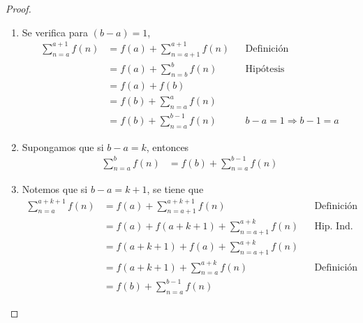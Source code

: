     \begin{proof}\leavevmode
      \begin{enumerate}[label=\Roman*)]
          \item Se verifica para $(b-a)=1$,
          \begin{align*}
            \sum_{n=a}^{a+1} f(n) &= f(a) + \sum_{n=a+1}^{a+1} f(n) && \text{Definición}\\
            &= f(a) + \sum_{n=b}^{b} f(n) && \text{Hipótesis}\\
            &= f(a) + f(b)\\
            &= f(b) + \sum_{n=a}^{a} f(n)\\
            &= f(b) + \sum_{n=a}^{b-1} f(n) && \text{$b-a=1 \Rightarrow b-1=a$}
          \end{align*}

          \item Supongamos que si $b-a=k$, entonces
          \begin{align*}
            \sum_{n=a}^{b} f(n) &= f(b) + \sum_{n=a}^{b-1} f(n)
          \end{align*}

          \item Notemos que si $b-a=k+1$, se tiene que
          \begin{align*}
            \sum_{n=a}^{a+k+1} f(n) &= f(a) + \sum_{n=a+1}^{a+k+1} f(n) && \text{Definición}\\
            &= f(a) + f(a+k+1) + \sum_{n=a+1}^{a+k} f(n) && \text{Hip. Ind.}\\
            &= f(a+k+1) + f(a) + \sum_{n=a+1}^{a+k} f(n)\\
            &= f(a+k+1) + \sum_{n=a}^{a+k} f(n) && \text{Definición}\\
            &= f(b) + \sum_{n=a}^{b-1} f(n)
          \end{align*}
        \end{enumerate}
    \end{proof}

